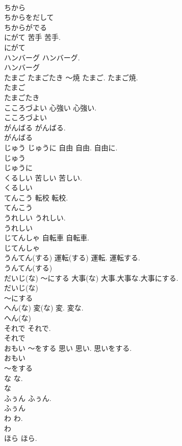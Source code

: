 \documentclass[8pt]{extreport}
\begin{document}
\begin{CJK}{UTF8}{min}
\\	ちから
\\	ちからをだして
\\	ちからがでる
\\	にがて	苦手	苦手.	
\\	にがて
\\	ハンバーグ		ハンバーグ.	
\\	ハンバーグ
\\	たまご たまごたき	～焼	たまご. たまご焼.	
\\	たまご
\\	たまごたき
\\	こころづよい	心強い	心強い.	
\\	こころづよい
\\	がんばる		がんばる.	
\\	がんばる
\\	じゅう じゅうに	自由	自由. 自由に.	
\\	じゅう
\\	じゅうに
\\	くるしい	苦しい	苦しい.	
\\	くるしい
\\	てんこう	転校	転校.	
\\	てんこう
\\	うれしい		うれしい.	
\\	うれしい
\\	じてんしゃ	自転車	自転車.	
\\	じてんしゃ
\\	うんてん(する)	運転(する)	運転. 運転する.	
\\	うんてん(する)
\\	だいじ(な) ～にする	大事(な)	大事.大事な.大事にする.	
\\	だいじ(な)
\\	～にする
\\	へん(な)	変(な)	変. 変な.	
\\	へん(な)
\\	それで		それで.	
\\	それで
\\	おもい ～をする	思い	思い. 思いをする.	
\\	おもい
\\	～をする
\\	な		な.	
\\	な
\\	ふぅん		ふぅん.	
\\	ふぅん
\\	わ		わ.	
\\	わ
\\	ほら		ほら.	

\end{CJK}
\end{document}
